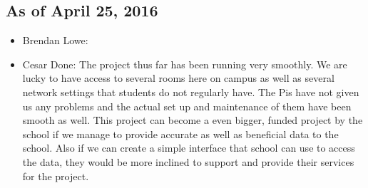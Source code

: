 \documentclass{article}
\begin{document}
		\subsection{As of April 25, 2016}
			\begin{itemize}
				\item Brendan Lowe:
				\item Cesar Done: The project thus far has been running very smoothly. We are lucky to have access to several rooms here on campus as well 
								  as several network settings that students do not regularly have. The Pis have not given us any problems and the actual set 
								  up and maintenance of them have been smooth as well. This project can  become a even bigger, funded project by the school
								   if we manage to provide accurate as well as beneficial data to the school. Also if we can create a simple interface that 
								   school can use to access the data, they would be more inclined to support and provide their services for the project. 
							

\end{itemize}
\end{document}
